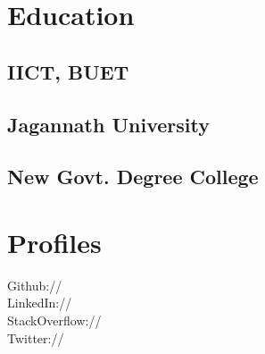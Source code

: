 \documentclass[]{deedy-resume-openfont}
\begin{document}

%
%

\begin{minipage}[t]{0.33\textwidth} 


\section{Education} 

\subsection{IICT, BUET}
\sectionsep

\subsection{Jagannath University}
\sectionsep

\subsection{New Govt. Degree College}
\sectionsep

\section{Profiles} 
Github:// \href{https://github.com/salayhin}{} \\
LinkedIn://  \href{https://www.linkedin.com/in/salayhin}{} \\
StackOverflow://  \href{https://stackoverflow.com/users/717600/sirajus-salayhin}{} \\
Twitter://  \href{https://twitter.com/salayhin}{} \\
\sectionsep


\end{minipage}
\end{document}
